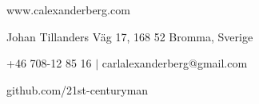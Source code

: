 \documentclass[../main.tex]{subfiles}
\begin{document}
\renewcommand{\maketitle}{
	\begin{center}
		{\LARGE\theauthor}

		www.calexanderberg.com

		Johan Tillanders Väg 17,  168 52 Bromma, Sverige

		+46 708-12 85 16 $|$ carlalexanderberg@gmail.com

		github.com/21st-centuryman
	\end{center}
}

\maketitle
\end{document}
